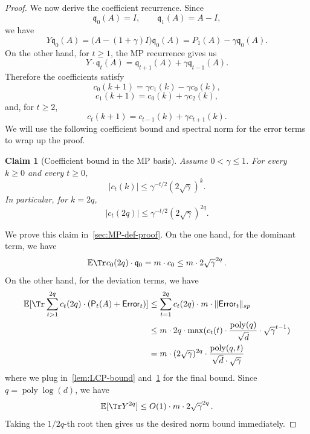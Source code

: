 \documentclass[12pt]{article}
\def \E {\mathbb{E}}
\newtheorem{claim}[theorem]{Claim}
\newcommand{\poly}{\operatorname{poly}}
\newcommand{\fp}{\mathsf{P}}
\newcommand{\q}{\mathfrak q}
\begin{document}
\begin{proof}
We now derive the coefficient recurrence. Since \[ \q_0(A)=I, \qquad \q_1(A)=A-I, \] we have \[ Y\q_0(A) = \bigl(A-(1+\gamma)I\bigr)\q_0(A) = P_1(A)-\gamma \q_0(A). \]
 On the other hand, for \(t\ge1\), the MP recurrence gives us \[ Y\cdot \q_t(A)=\q_{t+1}(A)+\gamma \q_{t-1}(A).  \] 
 Therefore the coefficients satisfy \[ c_0(k+1)=\gamma c_1(k)-\gamma c_0(k), \] \[ c_1(k+1)=c_0(k)+\gamma c_2(k), \] and, for \(t\ge2\), \[ c_t(k+1)=c_{t-1}(k)+\gamma c_{t+1}(k). \]
  We will use the following coefficient bound and spectral norm for the error terms to wrap up the proof. 
 \begin{claim}[Coefficient bound in the MP basis]
\label{clm:MP-coef-bnd} 
  Assume \(0<\gamma\le1\). For every \(k\ge0\) and every \(t\ge0\), \[ |c_t(k)| \le \gamma^{-t/2}(2\sqrt{\gamma})^k. \] 
 In particular, for \(k=2q\), \[ |c_t(2q)| \le \gamma^{-t/2}(2\sqrt{\gamma})^{2q}. \] \end{claim} 
We prove this claim in~\cref{sec:MP-def-proof}. 
On the one hand, for the dominant term, we have  \[ 
\E\Tr c_0(2q) \cdot \q_0 = m \cdot c_0 \leq  m \cdot 2\sqrt{\gamma}^{2q}\,.
\]
On the other hand, for the deviation terms, we have 
\begin{align*}
	\E[ \Tr \sum_{t>1}^{2q} c_t(2q) \cdot (\fp_t(A) + \mathsf{Error}_t)] &\leq \sum_{t=1}^{2q} c_t(2q) \cdot m \cdot \|  \mathsf{Error}_t\|_{sp}\\
	&\leq  m\cdot  2q \cdot \max(c_t(t)\cdot  \frac{\poly(q)}{\sqrt{d}} \cdot \sqrt{\gamma}^{t-1} )\\
	&=m \cdot (2\sqrt{\gamma})^{2q} \cdot \frac{\poly(q,t)}{\sqrt{d}\cdot \sqrt{\gamma}}
\end{align*} 
where we plug in~\cref{lem:LCP-bound} and~\cref{clm:MP-coef-bnd} for the final bound. Since $q = \poly\log (d)$, we have \[ 
\E[\Tr Y^{2q}] \leq  O(1) \cdot   m \cdot 2\sqrt{\gamma}^{2q}\,.
\]
Taking the $1/2q$-th root then gives us the desired norm bound immediately. 
\end{proof}
%
\end{document}
